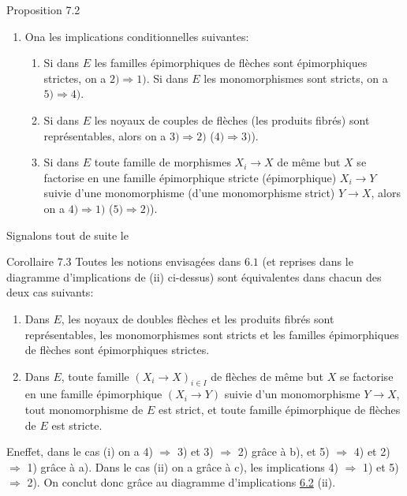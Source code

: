 \documentclass[10pt]{../fichiers-configuration-latex/smfart}
\def\labelenumi{(\theenumi)}
\def\labelenumii{(\theenumii)}
\begin{document}
\begin{enonce*}{Proposition 7.2}
\begin{enumerate}
\item On\pageoriginale a les implications conditionnelles suivantes:
\begin{enumerate}
\renewcommand{\theenumii}{\alph{enumii}}
\renewcommand{\labelenumii}{\theenumii)}
\item Si dans $E$ les familles épimorphiques de flèches sont
  épimorphiques strictes, on a $2)\Rightarrow 1)$. Si dans $E$ les
  monomorphismes sont stricts, on a $5)\Rightarrow 4)$.

\item Si dans $E$ les noyaux de couples de flèches (\resp  les
  produits fibrés) sont représentables, alors on a $3)\Rightarrow
  2)$ (\resp  $4)\Rightarrow 3)$).

\item Si dans $E$ toute famille de morphismes $X_i\rightarrow X$ de
  même but $X$ se factorise en une famille épimorphique stricte
  (\resp  épimorphique) $X_i\rightarrow Y$ suivie d'une monomorphisme
  (\resp  d'une monomorphisme strict) $Y\rightarrow X$, alors on a
  $4)\Rightarrow 1)$ (\resp  $5)\Rightarrow 2)$).
\end{enumerate}
\end{enumerate}
\end{enonce*}
Signalons tout de suite le

\begin{enonce*}{Corollaire 7.3}
Toutes les notions envisagées dans $6.1$ (et reprises dans le
diagramme d'implications de {\rm(ii)} ci-dessus) sont équivalentes
dans chacun des deux cas suivants:
\begin{enumerate}
\renewcommand{\theenumi}{\roman{enumi}}
\renewcommand{\labelenumi}{(\theenumi)}
\item Dans $E$, les noyaux de doubles flèches et les produits
  fibrés sont représentables, les monomorphismes sont stricts et
  les familles épimorphiques de flèches sont épimorphiques
  strictes.

\item Dans $E$, toute famille $(X_i\rightarrow X)_{i\in I}$ de
  flèches de même but $X$ se factorise en une famille
  épimorphique $(X_i\rightarrow Y)$ suivie d'un monomorphisme
  $Y\rightarrow X$, tout monomorphisme de $E$ est strict, et toute
  famille épimorphique de flèches de $E$ est stricte.
\end{enumerate}
\end{enonce*}

En\pageoriginale effet, dans le cas (i) on a 4) $\Rightarrow$ 3) et
3) $\Rightarrow$ 2) grâce à b), et 5) $\Rightarrow$ 4) et 2)
$\Rightarrow$ 1) grâce à a). Dans le cas (ii) on a grâce à c), les
implications 4) $\Rightarrow$ 1) et 5) $\Rightarrow$ 2). On conclut
donc grâce au diagramme d'implications \hyperref[I.prop6.2]{6.2} (ii).
\end{document}
